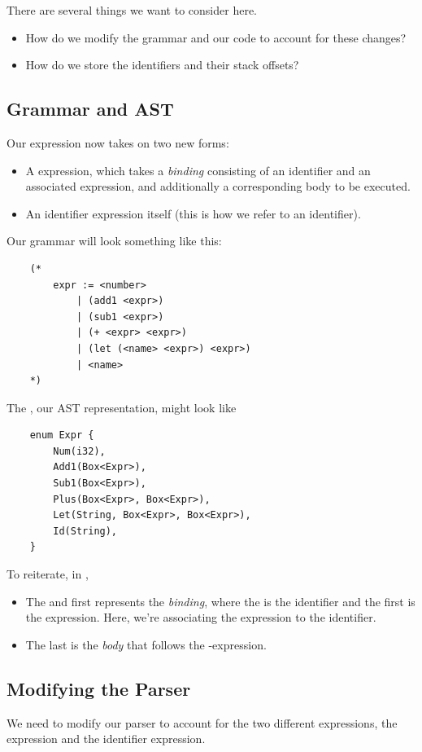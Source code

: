 \documentclass[letterpaper]{article}
\begin{document}
There are several things we want to consider here.
\begin{itemize}
    \item How do we modify the grammar and our code to account for these changes?
    \item How do we store the identifiers and their stack offsets? 
\end{itemize}

\subsection{Grammar and AST}
Our expression now takes on two new forms:
\begin{itemize}
    \item A  expression, which takes a \emph{binding} consisting of an identifier and an associated expression, and additionally a corresponding body to be executed. 
    \item An identifier expression itself (this is how we refer to an identifier). 
\end{itemize}
Our grammar will look something like this: 
\begin{verbatim}
    (*
        expr := <number>
            | (add1 <expr>)
            | (sub1 <expr>)
            | (+ <expr> <expr>)
            | (let (<name> <expr>) <expr>)
            | <name>
    *)\end{verbatim}
The  , our AST representation, might look like 
\begin{verbatim}
    enum Expr {
        Num(i32),
        Add1(Box<Expr>),
        Sub1(Box<Expr>),
        Plus(Box<Expr>, Box<Expr>),
        Let(String, Box<Expr>, Box<Expr>),
        Id(String),
    }\end{verbatim} 
To reiterate, in , 
\begin{itemize}
    \item The  and first  represents the \emph{binding}, where the  is the identifier and the first  is the expression. Here, we're associating the expression to the identifier. 
    \item The last  is the \emph{body} that follows the -expression.
\end{itemize}

\subsection{Modifying the Parser}
We need to modify our parser to account for the two different expressions, the  expression and the identifier expression. 
\end{document}
